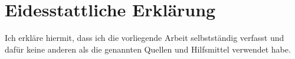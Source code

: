 \chapter*{Eidesstattliche Erkl\"arung}
\clearscrheadfoot

Ich erkl\"are hiermit, dass ich die vorliegende Arbeit selbstst\"andig verfasst und daf\"ur keine
anderen als die genannten Quellen und Hilfsmittel verwendet habe.

\begin{flushleft}
\vspace{3cm}
\docAuthor
\end{flushleft}
\begin{flushleft}
\docCity{} \docDate
\end{flushleft}